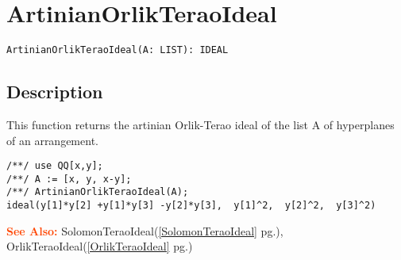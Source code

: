 \documentclass[a4paper]{mybook}
\newenvironment{command}{}{} %
\newcommand\SeeAlso{\par\textcolor{OrangeRed}{\textbf{\large See Also: }}}
\begin{document}
\section{ArtinianOrlikTeraoIdeal}
\label{ArtinianOrlikTeraoIdeal}
\begin{command} %


\begin{Verbatim}[label=syntax, rulecolor=\color{MidnightBlue},
frame=single]
ArtinianOrlikTeraoIdeal(A: LIST): IDEAL 
\end{Verbatim}


\subsection*{Description}

This function returns the artinian Orlik-Terao ideal of the list A of hyperplanes of an arrangement.
\begin{Verbatim}[label=example, rulecolor=\color{PineGreen}, frame=single]
/**/ use QQ[x,y];	
/**/ A := [x, y, x-y];
/**/ ArtinianOrlikTeraoIdeal(A);
ideal(y[1]*y[2] +y[1]*y[3] -y[2]*y[3],  y[1]^2,  y[2]^2,  y[3]^2)
\end{Verbatim}


\SeeAlso %
  SolomonTeraoIdeal(\ref{SolomonTeraoIdeal} pg.\pageref{SolomonTeraoIdeal}), 
    OrlikTeraoIdeal(\ref{OrlikTeraoIdeal} pg.\pageref{OrlikTeraoIdeal})
\end{command} %
\end{document}
